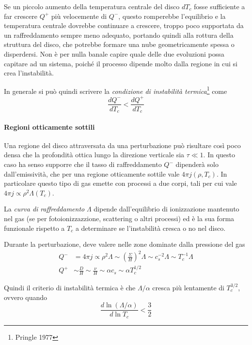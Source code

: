 \documentclass[a4paperbi]{article}
\begin{document}
	Se un piccolo aumento della temperatura centrale del disco $dT_c$ fosse sufficiente a far crescere $Q^+$ più velocemente di $Q^-$, questo romperebbe l'equilibrio e la temperatura centrale dovrebbe continuare a crescere, troppo poco supportata da un raffreddamento sempre meno adequato, portando quindi alla rottura della struttura del disco, che potrebbe formare una nube geometricamente spessa o disperdersi. Non è per nulla banale capire quale delle due evoluzioni possa capitare ad un sistema, poiché il processo dipende molto dalla regione in cui si crea l'instabilità.
	
	In generale si può quindi scrivere la \textit{condizione di instabilità termica}\footnote{Pringle 1977} come
	\begin{equation}
		\frac{dQ^-}{dT_c}<\frac{dQ^+}{dT_c}
	\end{equation}

	\paragraph{Regioni otticamente sottili}
	Una regione del disco attraversata da una perturbazione può risultare così poco densa che la profondità ottica lungo la direzione verticale sia $\tau\ll1$. In questo caso ha senso supporre che il tasso di raffreddamento $Q^-$ dipenderà solo dall'emissività, che per una regione otticamente sottile vale $4\pi j(\rho,T_c)$. In particolare questo tipo di gas emette con processi a due corpi, tali per cui vale $4\pi j\propto \rho^2\Lambda(T_c)$. 
	
	La \textit{curva di raffreddamento} $\Lambda$ dipende dall'equilibrio di ionizzazione mantenuto nel gas (se per fotoionizzazzione, scattering o altri processi) ed è la sua forma funzionale rispetto a $T_c$ a determinare se l'instabilità cresca o no nel disco.
	
	Durante la perturbazione, deve valere nelle zone dominate dalla pressione del gas
	\begin{align*}
		Q^-&=4\pi j\propto\rho^2\Lambda\sim\left(\frac{\Sigma}{H}\right)^2\Lambda\sim c_s^{-2}\Lambda\sim T_c^{-1}\Lambda\\
		Q^+&\sim\frac{D}{H}\sim\frac{\nu}{H}\sim\alpha c_s\sim\alpha T_c^{1/2}
	\end{align*}
	
	Quindi il criterio di instabilità termica è che $\Lambda/\alpha$ cresca più lentamente di $T_c^{3/2}$, ovvero quando
	\begin{equation}
		\frac{d\ln{(\Lambda/\alpha)}}{d\ln{T_c}}<\frac{3}{2}
	\end{equation}
	
\end{document}
